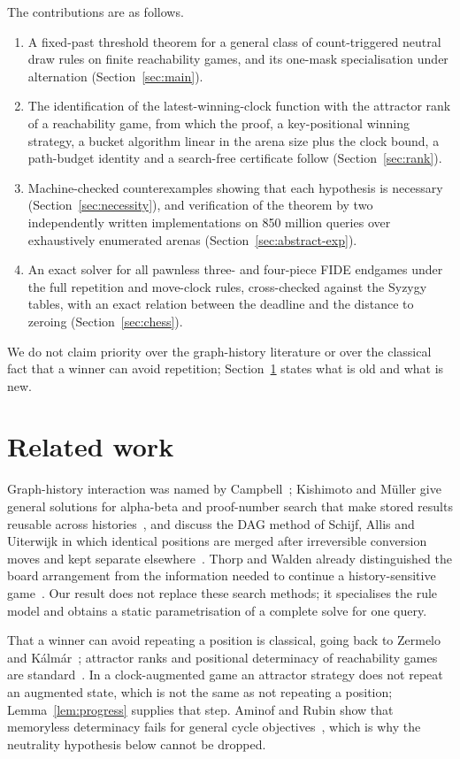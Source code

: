 \documentclass[journal]{IEEEtran}
\theoremstyle{definition}
\theoremstyle{remark}
\begin{document}
The contributions are as follows.
\begin{enumerate}
\item A fixed-past threshold theorem for a general class of count-triggered neutral draw rules on finite reachability games, and its one-mask specialisation under alternation (Section~\ref{sec:main}).
\item The identification of the latest-winning-clock function with the attractor rank of a reachability game, from which the proof, a key-positional winning strategy, a bucket algorithm linear in the arena size plus the clock bound, a path-budget identity and a search-free certificate follow (Section~\ref{sec:rank}).
\item Machine-checked counterexamples showing that each hypothesis is necessary (Section~\ref{sec:necessity}), and verification of the theorem by two independently written implementations on 850 million queries over exhaustively enumerated arenas (Section~\ref{sec:abstract-exp}).
\item An exact solver for all pawnless three- and four-piece FIDE endgames under the full repetition and move-clock rules, cross-checked against the Syzygy tables, with an exact relation between the deadline and the distance to zeroing (Section~\ref{sec:chess}).
\end{enumerate}
We do not claim priority over the graph-history literature or over the classical fact that a winner can avoid repetition; Section~\ref{sec:related} states what is old and what is new.

\section{Related work}\label{sec:related}

Graph-history interaction was named by Campbell~\cite{campbell1985}; Kishimoto and M\"uller give general solutions for alpha-beta and proof-number search that make stored results reusable across histories~\cite{kishimoto2004,kishimoto2005}, and discuss the DAG method of Schijf, Allis and Uiterwijk in which identical positions are merged after irreversible conversion moves and kept separate elsewhere~\cite{schijf1994}. Thorp and Walden already distinguished the board arrangement from the information needed to continue a history-sensitive game~\cite{thorp1972}. Our result does not replace these search methods; it specialises the rule model and obtains a static parametrisation of a complete solve for one query.

That a winner can avoid repeating a position is classical, going back to Zermelo and K\'alm\'ar~\cite{schwalbe2001}; attractor ranks and positional determinacy of reachability games are standard~\cite{gradel2002,zielonka1998}. In a clock-augmented game an attractor strategy does not repeat an augmented state, which is not the same as not repeating a position; Lemma~\ref{lem:progress} supplies that step. Aminof and Rubin show that memoryless determinacy fails for general cycle objectives~\cite{aminof2017}, which is why the neutrality hypothesis below cannot be dropped.
\end{document}
